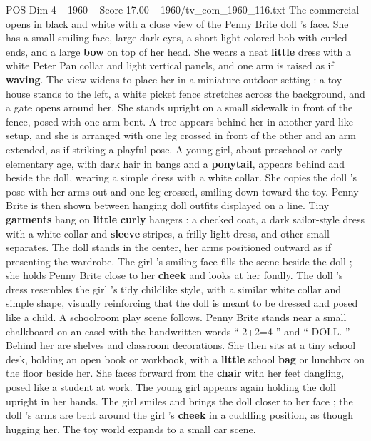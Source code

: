 \begin{textsample}{POS Dim 4 – 1960 – Score 17.00 – 1960/tv\_com\_1960\_116.txt}  \label{ex:f4_pos_063}
The commercial opens in black and white with a close view of the Penny Brite doll ’s face.
She has a small smiling face, large dark eyes, a short light-colored bob with curled ends, and a large \textbf{bow} on top of her head.
She wears a neat \textbf{little} dress with a white Peter Pan collar and light vertical panels, and one arm is raised as if \textbf{waving}.
The view widens to place her in a miniature outdoor setting : a toy house stands to the left, a white picket fence stretches across the background, and a gate opens around her.
She stands upright on a small sidewalk in front of the fence, posed with one arm bent.
A tree appears behind her in another yard-like setup, and she is arranged with one leg crossed in front of the other and an arm extended, as if striking a playful pose.
A young girl, about preschool or early elementary age, with dark hair in bangs and a \textbf{ponytail}, appears behind and beside the doll, wearing a simple dress with a white collar.
She copies the doll ’s pose with her arms out and one leg crossed, smiling down toward the toy.
Penny Brite is then shown between hanging doll outfits displayed on a line.
Tiny \textbf{garments} hang on \textbf{little} \textbf{curly} hangers : a checked coat, a dark sailor-style dress with a white collar and \textbf{sleeve} stripes, a frilly light dress, and other small separates.
The doll stands in the center, her arms positioned outward as if presenting the wardrobe.
The girl ’s smiling face fills the scene beside the doll ; she holds Penny Brite close to her \textbf{cheek} and looks at her fondly.
The doll ’s dress resembles the girl ’s tidy childlike style, with a similar white collar and simple shape, visually reinforcing that the doll is meant to be dressed and posed like a child.
A schoolroom play scene follows.
Penny Brite stands near a small chalkboard on an easel with the handwritten words “ 2+2=4 ” and “ DOLL. ” Behind her are shelves and classroom decorations.
She then sits at a tiny school desk, holding an open book or workbook, with a \textbf{little} school \textbf{bag} or lunchbox on the floor beside her.
She faces forward from the \textbf{chair} with her feet dangling, posed like a student at work.
The young girl appears again holding the doll upright in her hands.
The girl smiles and brings the doll closer to her face ; the doll ’s arms are bent around the girl ’s \textbf{cheek} in a cuddling position, as though hugging her.
The toy world expands to a small car scene.

\end{textsample}
